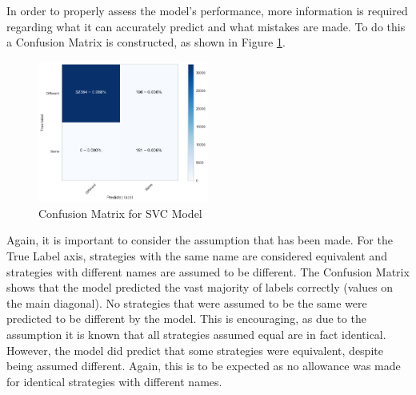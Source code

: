 In order to properly assess the model's performance, more information is required regarding what it can accurately predict and what mistakes are made.
To do this a Confusion Matrix is constructed, as shown in Figure \ref{fig:conf_matrix}.

\begin{figure}[htbp!]
    \centering
    \includegraphics[width=0.5\textwidth]{../img/ML/confusion_matrix.png}
    \caption{Confusion Matrix for SVC Model}
    \label{fig:conf_matrix}
\end{figure}

Again, it is important to consider the assumption that has been made.
For the True Label axis, strategies with the same name are considered equivalent and strategies with different names are assumed to be different.
The Confusion Matrix shows that the model predicted the vast majority of labels correctly (values on the main diagonal).
No strategies that were assumed to be the same were predicted to be different by the model.
This is encouraging, as due to the assumption it is known that all strategies assumed equal are in fact identical.
However, the model did predict that some strategies were equivalent, despite being assumed different.
Again, this is to be expected as no allowance was made for identical strategies with different names.


